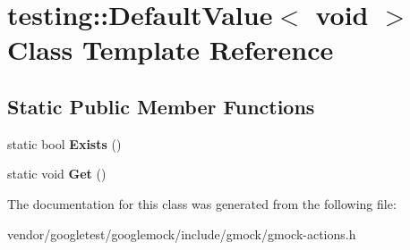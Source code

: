 \hypertarget{classtesting_1_1_default_value_3_01void_01_4}{}\section{testing\+:\+:Default\+Value$<$ void $>$ Class Template Reference}
\label{classtesting_1_1_default_value_3_01void_01_4}
\subsection*{Static Public Member Functions}
\begin{DoxyCompactItemize}
\item 
\mbox{\label{classtesting_1_1_default_value_3_01void_01_4_ae18ea46cbf928b820c91f15fa7aa317b}} 
static bool {\bfseries Exists} ()
\item 
\mbox{\label{classtesting_1_1_default_value_3_01void_01_4_acda4c367a5b0c0cfb28bc2289f385eed}} 
static void {\bfseries Get} ()
\end{DoxyCompactItemize}


The documentation for this class was generated from the following file\+:\begin{DoxyCompactItemize}
\item 
vendor/googletest/googlemock/include/gmock/gmock-\/actions.\+h\end{DoxyCompactItemize}
